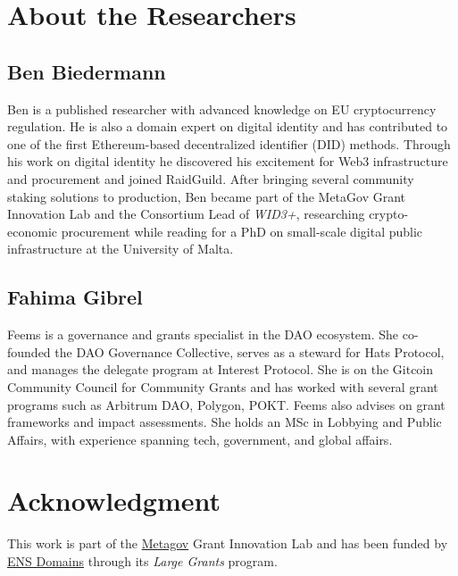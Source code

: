 \documentclass[a4,10pt]{article}
\begin{document}
\section*{About the Researchers}\label{sec_13}

\subsection*{Ben Biedermann}\label{sec_13.1}
Ben is a published researcher with advanced knowledge on EU cryptocurrency regulation. He is also a domain expert on digital identity and has contributed to one of the first Ethereum-based decentralized identifier (DID) methods. Through his work on digital identity he discovered his excitement for Web3 infrastructure and procurement and joined RaidGuild. After bringing several community staking solutions to production, Ben became part of the MetaGov Grant Innovation Lab and the Consortium Lead of \textit{WID3+}, researching crypto-economic procurement while reading for a PhD on small-scale digital public infrastructure at the University of Malta.

\subsection*{Fahima Gibrel}\label{sec_13.2}
Feems is a governance and grants specialist in the DAO ecosystem. She co-founded the DAO Governance Collective, serves as a steward for Hats Protocol, and manages the delegate program at Interest Protocol. She is on the Gitcoin Community Council for Community Grants and has worked with several grant programs such as Arbitrum DAO, Polygon, POKT. Feems also advises on grant frameworks and impact assessments. She holds an MSc in Lobbying and Public Affairs, with experience spanning tech, government, and global affairs.


\section*{Acknowledgment}\label{sec_14}

This work is part of the \href{https://metagov.org/}{Metagov} Grant Innovation Lab and has been funded by \href{https://ens.domains/}{ENS Domains} through its \textit{Large Grants} program.
\end{document}
